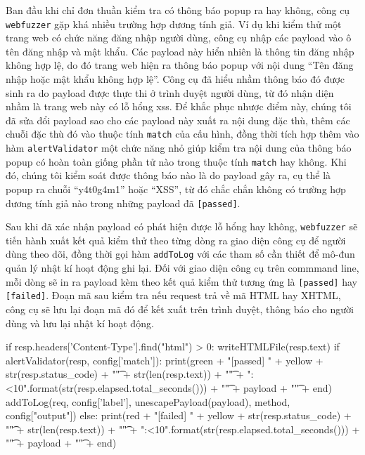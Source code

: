 Ban đầu khi chỉ đơn thuần kiểm tra có thông báo popup ra hay không, công cụ \texttt{webfuzzer} gặp khá nhiều trường hợp dương tính giả. Ví dụ khi kiểm thử một trang web có chức năng đăng nhập người dùng, công cụ nhập các payload vào ô tên đăng nhập và mật khẩu. Các payload này hiển nhiên là thông tin đăng nhập không hợp lệ, do đó trang web hiện ra thông báo popup với nội dung ``Tên đăng nhập hoặc mật khẩu không hợp lệ''. Công cụ đã hiểu nhầm thông báo đó được sinh ra do payload được thực thi ở trình duyệt người dùng, từ đó nhận diện nhầm là trang web này có lỗ hổng \acrshort{xss}. Để khắc phục nhược điểm này, chúng tôi đã sửa đổi payload sao cho các payload này xuất ra nội dung đặc thù, thêm các chuỗi đặc thù đó vào thuộc tính \texttt{match} của cấu hình, đồng thời tích hợp thêm vào hàm \texttt{alertValidator} một chức năng nhỏ giúp kiểm tra nội dung của thông báo popup có hoàn toàn giống phần tử nào trong thuộc tính \texttt{match} hay không. Khi đó, chúng tôi kiểm soát được thông báo nào là do payload gây ra, cụ thể là popup ra chuỗi ``y4t0g4m1'' hoặc ``XSS'', từ đó chắc chắn không có trường hợp dương tính giả nào trong những payload đã \texttt{[passed]}.\par
Sau khi đã xác nhận payload có phát hiện được lỗ hổng hay không, \texttt{webfuzzer} sẽ tiến hành xuất kết quả kiểm thử theo từng dòng ra giao diện công cụ để người dùng theo dõi, đồng thời gọi hàm \texttt{addToLog} với các tham số cần thiết để mô-đun quản lý nhật kí hoạt động ghi lại. Đối với giao diện công cụ trên commmand line, mỗi dòng sẽ in ra payload kèm theo kết quả kiểm thử tương ứng là \texttt{[passed]} hay \texttt{[failed]}. Đoạn mã sau kiểm tra nếu request trả về mã HTML hay XHTML, công cụ sẽ lưu lại đoạn mã đó để kết xuất trên trình duyệt, thông báo cho người dùng và lưu lại nhật kí hoạt động.\\
\begin{python}
if resp.headers['Content-Type'].find("html") > 0:
    writeHTMLFile(resp.text)
    if alertValidator(resp, config['match']):
        print(green + "[passed]    " + yellow + str(resp.status_code) + "\t" + str(len(resp.text)) + "\t" + "{:<10}".format(str(resp.elapsed.total_seconds())) + "\t" +  payload + "\t" + end)
        addToLog(req, config['label'], unescapePayload(payload), method, config["output"])
    else:
        print(red + "[failed]    " + yellow + str(resp.status_code) + "\t" + str(len(resp.text)) + "\t" + "{:<10}".format(str(resp.elapsed.total_seconds())) + "\t" +  payload + "\t" +  end)
\end{python}
